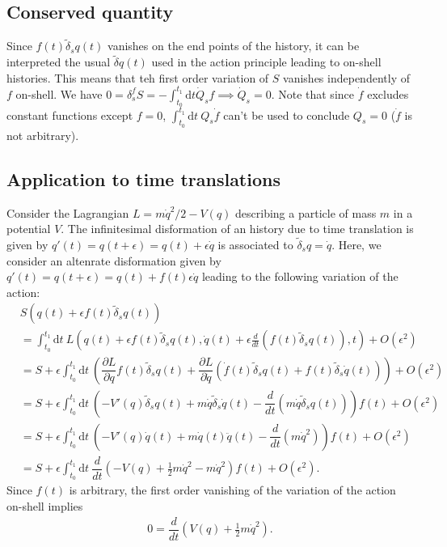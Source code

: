 \documentclass[10pt, a4paper]{article}
\begin{document}
\subsection{Conserved quantity}
Since $f(t)\tilde{\delta}_s q(t)$ vanishes on the end points of the history, it can be interpreted the usual $\tilde{\delta} q(t)$ used in the action principle leading to on-shell histories. This means that teh first order variation of $S$ vanishes independently of $f$ on-shell. We have $0 = \delta_s^f S = -\int_{t_0}^{t_1} \text{d}t \dot{Q}_s f \implies \dot{Q}_s = 0$. Note that since $\dot{f}$ excludes constant functions except $f=0$, $\int_{t_0}^{t_1} \text{d}t \  Q_s \dot{f}$ can't be used to conclude $Q_s = 0$ ($\dot{f}$ is not arbitrary). 
\subsection{Application to time translations}
Consider the Lagrangian $L= m \dot{q}^2/2 - V(q)$ describing a particle of mass $m$ in a potential $V$. The infinitesimal disformation of an history due to time translation is given by $q'(t) = q(t+\epsilon) =  q(t) + \epsilon\dot{q}$ is associated to $\tilde{\delta}_s q = \dot{q}$. Here, we consider an altenrate disformation given by  $q'(t) = q(t+\epsilon) =  q(t) + f(t)\epsilon\dot{q}$ leading to the following variation of the action:
\begin{align*}
    &S(q(t) +\epsilon f(t) \tilde{\delta}_s q(t))\\ &= \int_{t_0}^{t_1} \text{d}t \ L(q(t) +\epsilon f(t) \tilde{\delta}_s q(t), \dot{q}(t) +\epsilon \frac{d}{dt} (f(t) \tilde{\delta}_s q(t)), t) + O(\epsilon^2)\\
    &= S + \epsilon\int_{t_0}^{t_1} \text{d}t \ \left( \dfrac{\partial L}{\partial q}  f(t) \tilde{\delta}_s q(t) + \dfrac{\partial L}{\partial \dot{q}}  (\dot{f}(t) \tilde{\delta}_s q(t)+f(t) \tilde{\delta}_s \dot{q}(t))\right) + O(\epsilon^2)\\
    &= S + \epsilon\int_{t_0}^{t_1} \text{d}t \  \left(-V'(q) \tilde{\delta}_s q(t) + m\dot{q} \tilde{\delta}_s \dot{q}(t) -\dfrac{d}{dt}\left( m \dot{q} \tilde{\delta}_s q(t) \right) \right)f(t) + O(\epsilon^2)\\
    &= S + \epsilon\int_{t_0}^{t_1} \text{d}t \  \left(-V'(q) \dot{q}(t) + m \dot{q}(t) \ddot{q}(t)-\dfrac{d}{dt}\left( m \dot{q}^2 \right) \right)f(t) + O(\epsilon^2)\\
    &= S + \epsilon\int_{t_0}^{t_1} \text{d}t \ \dfrac{d}{dt}\left(-V(q) + \frac{1}{2}m \dot{q}^2-m \dot{q}^2 \right) f(t) + O(\epsilon^2).
\end{align*}
Since $f(t)$ is arbitrary, the first order vanishing of the variation of the action on-shell implies 
\begin{align*}
    0 = \dfrac{d}{dt}\left(V(q) + \frac{1}{2}m \dot{q}^2\right).
\end{align*}


\makereferences


\end{document}
